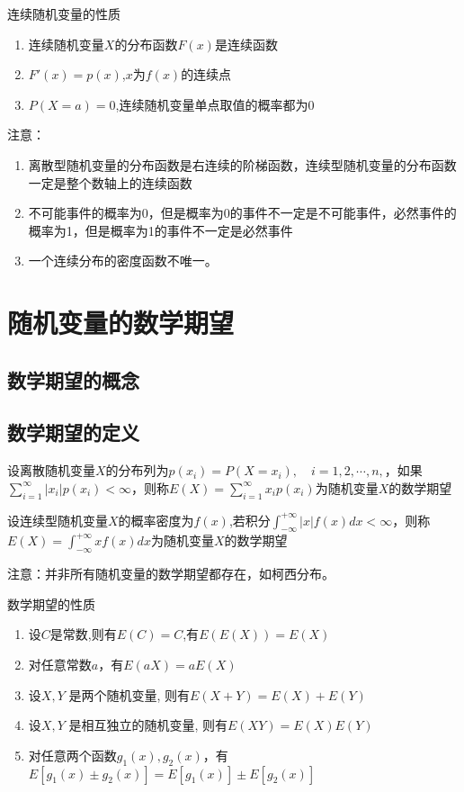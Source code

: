 连续随机变量的性质
\begin{enumerate}
    \item  连续随机变量$X$的分布函数$F(x)$是连续函数
    \item $F'(x) = p(x)$,$x$为$f(x)$的连续点
    \item $P(X = a) = 0$,连续随机变量单点取值的概率都为0
\end{enumerate}

注意：
\begin{enumerate}
    \item  离散型随机变量的分布函数是右连续的阶梯函数，连续型随机变量的分布函数一定是整个数轴上的连续函数
    \item 不可能事件的概率为0，但是概率为0的事件不一定是不可能事件，必然事件的概率为1，但是概率为1的事件不一定是必然事件
    \item 一个连续分布的密度函数不唯一。
\end{enumerate}

\section{随机变量的数学期望}
\subsection{数学期望的概念}
\subsection{数学期望的定义}

\begin{definition}[离散型随机变量的数学期望]
    设离散随机变量$X$的分布列为$p(x_i)=P( X = x_i),\quad i = 1,2, \cdots,n, $，如果$\sum\limits_{i = 1}^\infty  |{x_i}|{p(x_i)} < \infty $，则称$E(X) = \sum\limits_{i = 1}^\infty  {{x_i}{p(x_i)}} $为随机变量$X$的数学期望
\end{definition}

\begin{definition}[连续型随机变量的数学期望]
    设连续型随机变量$X$的概率密度为$f(x)$,若积分$\int_{ - \infty }^{ + \infty } {|x|f(x)dx} < \infty $，则称$E(X) = \int_{ - \infty }^{ + \infty } {xf(x)dx} $为随机变量$X$的数学期望
\end{definition}

注意：并非所有随机变量的数学期望都存在，如柯西分布。

\begin{property}
    数学期望的性质
    \begin{enumerate}
        \item  设$C$是常数,则有$E(C) = C$,有$E(E(X)) = E(X)$
        \item 对任意常数$a$，有$E(aX)=aE(X)$
        \item 设$X,Y$ 是两个随机变量, 则有$E(X + Y) = E(X) + E(Y)$
        \item 设$X,Y$ 是相互独立的随机变量, 则有$E(XY) = E(X)E(Y)$
        \item 对任意两个函数$g_1(x),g_2(x)$，有$E[g_1(x) \pm g_2(x)]=E[g_1(x)] \pm E[g_2(x)]$

    \end{enumerate}
\end{property}

